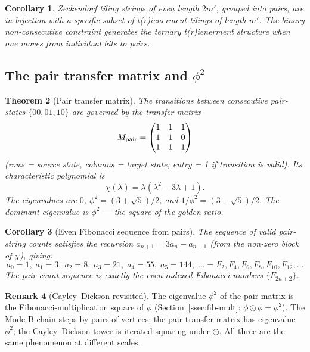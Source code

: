 \documentclass[12pt,reqno]{amsart}
\newtheorem{theorem}{Theorem}[section]
\newtheorem{corollary}[theorem]{Corollary}
\theoremstyle{definition}
\newtheorem{remark}[theorem]{Remark}
\theoremstyle{plain}
\begin{document}
\begin{corollary}
Zeckendorf tiling strings of even length $2m'$, grouped into pairs,
are in bijection with a specific subset of t(r)ienerment tilings of
length $m'$.  The binary non-consecutive constraint generates the
ternary t(r)ienerment structure when one moves from individual bits
to pairs.
\end{corollary}

\subsection{The pair transfer matrix and \texorpdfstring{$\phi^2$}{phi\^{}2}}
\label{ssec:pair-transfer}

\begin{theorem}[Pair transfer matrix]\label{thm:pair-transfer}
The transitions between consecutive pair-states $\{00,01,10\}$ are
governed by the transfer matrix
\[
  M_{\rm pair}=\begin{pmatrix}1&1&1\\1&1&0\\1&1&1\end{pmatrix}
\]
(rows = source state, columns = target state; entry = 1 if transition
is valid).  Its characteristic polynomial is
\[
  \chi(\lambda)=\lambda(\lambda^2-3\lambda+1).
\]
The eigenvalues are $0$, $\phi^2=(3+\sqrt{5})/2$, and $1/\phi^2=(3-\sqrt{5})/2$.
The dominant eigenvalue is $\phi^2$ — the \emph{square of the golden ratio}.
\end{theorem}

\begin{corollary}[Even Fibonacci sequence from pairs]\label{cor:even-fib}
The sequence of valid pair-string counts satisfies the recursion
$a_{n+1}=3a_n-a_{n-1}$ (from the non-zero block of $\chi$), giving:
\[
  a_0=1,\;a_1=3,\;a_2=8,\;a_3=21,\;a_4=55,\;a_5=144,\;\ldots
  =F_2,F_4,F_6,F_8,F_{10},F_{12},\ldots
\]
The pair-count sequence is \emph{exactly the even-indexed Fibonacci numbers}
$\{F_{2n+2}\}$.
\end{corollary}

\begin{remark}[Cayley--Dickson revisited]
The eigenvalue $\phi^2$ of the pair matrix is the Fibonacci-multiplication
square of $\phi$ (Section~\ref{ssec:fib-mult}: $\phi\odot\phi=\phi^2$).
The Mode-B chain steps by pairs of vertices; the pair transfer matrix
has eigenvalue $\phi^2$; the Cayley--Dickson tower is iterated squaring
under $\odot$.  All three are the same phenomenon at different scales.
\end{remark}
\end{document}
